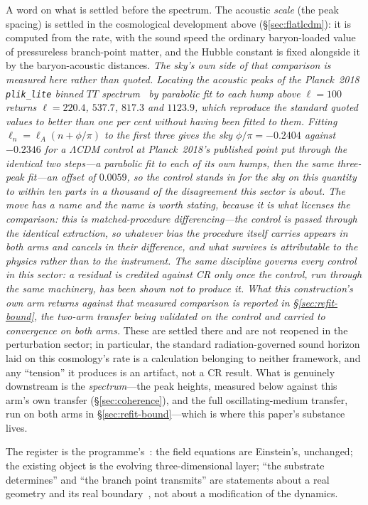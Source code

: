 \documentclass[11pt,a4paper]{article}
\theoremstyle{plain}
\theoremstyle{definition}
\theoremstyle{remark}
\begin{document}
A word on what is settled before the spectrum. The acoustic \emph{scale} (the peak spacing) is settled in the cosmological development above (\S\ref{sec:flatlcdm}): it is computed from the rate, with the sound speed the ordinary baryon-loaded value of pressureless branch-point matter, and the Hubble constant is fixed alongside it by the baryon-acoustic distances. \emph{The sky's own side of that comparison is measured here rather than quoted. Locating the acoustic peaks of the Planck~2018 \texttt{plik\_lite} binned $TT$ spectrum~\cite{Planck2018} by parabolic fit to each hump above $\ell=100$ returns $\ell=220.4$, $537.7$, $817.3$ and $1123.9$, which reproduce the standard quoted values to better than one per cent without having been fitted to them. Fitting $\ell_n=\ell_A(n+\phi/\pi)$ to the first three gives the sky $\phi/\pi=-0.2404$ against $-0.2346$ for a $\Lambda$CDM control at Planck~2018's published point put through the identical two steps---a parabolic fit to each of its own humps, then the same three-peak fit---an offset of $0.0059$, so the control stands in for the sky on this quantity to within ten parts in a thousand of the disagreement this sector is about. \emph{The move has a name and the name is worth stating, because it is what licenses the comparison}: this is \emph{matched-procedure differencing}---the control is passed through the identical extraction, so whatever bias the procedure itself carries appears in both arms and cancels in their difference, and what survives is attributable to the physics rather than to the instrument. \emph{The same discipline governs every control in this sector}: a residual is credited against CR only once the control, run through the same machinery, has been shown not to produce it. \emph{What this construction's own arm returns against that measured comparison is reported in \S\ref{sec:refit-bound}}, the two-arm transfer being validated on the control and carried to convergence on both arms.} These are settled there and are not reopened in the perturbation sector; in particular, the standard radiation-governed sound horizon laid on this cosmology's rate is a calculation belonging to neither framework, and any ``tension'' it produces is an artifact, not a CR result. What is genuinely downstream is the \emph{spectrum}---the peak heights, measured below against this arm's own transfer (\S\ref{sec:coherence}), and the full oscillating-medium transfer, run on both arms in \S\ref{sec:refit-bound}---which is where this paper's substance lives.

The register is the programme's~\cite{Janzen2025,JanzenCRframework}: the field equations are Einstein's, unchanged; the existing object is the evolving three-dimensional layer; ``the substrate determines'' and ``the branch point transmits'' are statements about a real geometry and its real boundary~\cite{JanzenGeometricCore,Janzen2012}, not about a modification of the dynamics.
\end{document}
